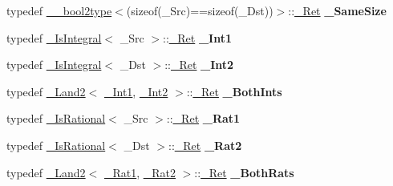 \begin{DoxyCompactItemize}
\item 
\mbox{\label{struct___trivial_native_type_copy_a81f95923d2d1ab2a151df4a50eda9763}} 
typedef \hyperlink{struct____bool2type}{\+\_\+\+\_\+bool2type}$<$(sizeof(\+\_\+\+Src)==sizeof(\+\_\+\+Dst))$>$\+::\hyperlink{struct____true__type}{\+\_\+\+Ret} {\bfseries \+\_\+\+Same\+Size}
\item 
\mbox{\label{struct___trivial_native_type_copy_a29dc2106318dbbe1bb4ae2ef7c92375b}} 
typedef \hyperlink{struct___is_integral}{\+\_\+\+Is\+Integral}$<$ \+\_\+\+Src $>$\+::\hyperlink{struct____true__type}{\+\_\+\+Ret} {\bfseries \+\_\+\+Int1}
\item 
\mbox{\label{struct___trivial_native_type_copy_a7bada904bd9df0d9e3913120efba2a61}} 
typedef \hyperlink{struct___is_integral}{\+\_\+\+Is\+Integral}$<$ \+\_\+\+Dst $>$\+::\hyperlink{struct____true__type}{\+\_\+\+Ret} {\bfseries \+\_\+\+Int2}
\item 
\mbox{\label{struct___trivial_native_type_copy_a143dcff598a780383c51c49224d06ea8}} 
typedef \hyperlink{struct___land2}{\+\_\+\+Land2}$<$ \hyperlink{struct____true__type}{\+\_\+\+Int1}, \hyperlink{struct____true__type}{\+\_\+\+Int2} $>$\+::\hyperlink{struct____true__type}{\+\_\+\+Ret} {\bfseries \+\_\+\+Both\+Ints}
\item 
\mbox{\label{struct___trivial_native_type_copy_a81fec9053242ebeaadb2e7ab51b85951}} 
typedef \hyperlink{struct___is_rational}{\+\_\+\+Is\+Rational}$<$ \+\_\+\+Src $>$\+::\hyperlink{struct____true__type}{\+\_\+\+Ret} {\bfseries \+\_\+\+Rat1}
\item 
\mbox{\label{struct___trivial_native_type_copy_a71a718c70d9ec65ac6247aec571d1d26}} 
typedef \hyperlink{struct___is_rational}{\+\_\+\+Is\+Rational}$<$ \+\_\+\+Dst $>$\+::\hyperlink{struct____true__type}{\+\_\+\+Ret} {\bfseries \+\_\+\+Rat2}
\item 
\mbox{\label{struct___trivial_native_type_copy_a92dd704d1b53dcbab4667d739af81852}} 
typedef \hyperlink{struct___land2}{\+\_\+\+Land2}$<$ \hyperlink{struct____true__type}{\+\_\+\+Rat1}, \hyperlink{struct____true__type}{\+\_\+\+Rat2} $>$\+::\hyperlink{struct____true__type}{\+\_\+\+Ret} {\bfseries \+\_\+\+Both\+Rats}

\end{DoxyCompactItemize}
